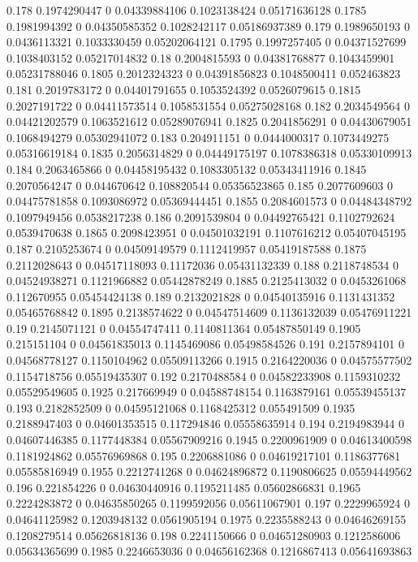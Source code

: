 {0.178 0.1974290447 0 0.04339884106 0.1023138424 0.05171636128
0.1785 0.1981994392 0 0.04350585352 0.1028242117 0.05186937389
0.179 0.1989650193 0 0.0436113321 0.1033330459 0.05202064121
0.1795 0.1997257405 0 0.04371527699 0.1038403152 0.05217014832
0.18 0.2004815593 0 0.04381768877 0.1043459901 0.05231788046
0.1805 0.2012324323 0 0.04391856823 0.1048500411 0.052463823
0.181 0.2019783172 0 0.04401791655 0.1053524392 0.0526079615
0.1815 0.2027191722 0 0.04411573514 0.1058531554 0.05275028168
0.182 0.2034549564 0 0.04421202579 0.1063521612 0.05289076941
0.1825 0.2041856291 0 0.04430679051 0.1068494279 0.05302941072
0.183 0.204911151 0 0.0444000317 0.1073449275 0.05316619184
0.1835 0.2056314829 0 0.04449175197 0.1078386318 0.05330109913
0.184 0.2063465866 0 0.04458195432 0.1083305132 0.05343411916
0.1845 0.2070564247 0 0.044670642 0.108820544 0.05356523865
0.185 0.2077609603 0 0.04475781858 0.1093086972 0.05369444451
0.1855 0.2084601573 0 0.04484348792 0.1097949456 0.0538217238
0.186 0.2091539804 0 0.04492765421 0.1102792624 0.0539470638
0.1865 0.2098423951 0 0.04501032191 0.1107616212 0.05407045195
0.187 0.2105253674 0 0.04509149579 0.1112419957 0.05419187588
0.1875 0.2112028643 0 0.04517118093 0.11172036 0.05431132339
0.188 0.2118748534 0 0.04524938271 0.1121966882 0.05442878249
0.1885 0.2125413032 0 0.0453261068 0.112670955 0.05454424138
0.189 0.2132021828 0 0.04540135916 0.1131431352 0.05465768842
0.1895 0.2138574622 0 0.04547514609 0.1136132039 0.05476911221
0.19 0.2145071121 0 0.04554747411 0.1140811364 0.05487850149
0.1905 0.215151104 0 0.04561835013 0.1145469086 0.05498584526
0.191 0.2157894101 0 0.04568778127 0.1150104962 0.05509113266
0.1915 0.2164220036 0 0.04575577502 0.1154718756 0.05519435307
0.192 0.2170488584 0 0.04582233908 0.1159310232 0.05529549605
0.1925 0.217669949 0 0.04588748154 0.1163879161 0.05539455137
0.193 0.2182852509 0 0.04595121068 0.1168425312 0.055491509
0.1935 0.2188947403 0 0.04601353515 0.117294846 0.05558635914
0.194 0.2194983944 0 0.04607446385 0.1177448384 0.05567909216
0.1945 0.2200961909 0 0.04613400598 0.1181924862 0.05576969868
0.195 0.2206881086 0 0.04619217101 0.1186377681 0.05585816949
0.1955 0.2212741268 0 0.04624896872 0.1190806625 0.05594449562
0.196 0.221854226 0 0.04630440916 0.1195211485 0.05602866831
0.1965 0.2224283872 0 0.04635850265 0.1199592056 0.05611067901
0.197 0.2229965924 0 0.04641125982 0.1203948132 0.0561905194
0.1975 0.2235588243 0 0.04646269155 0.1208279514 0.05626818136
0.198 0.2241150666 0 0.04651280903 0.1212586006 0.05634365699
0.1985 0.2246653036 0 0.04656162368 0.1216867413 0.05641693863
}
